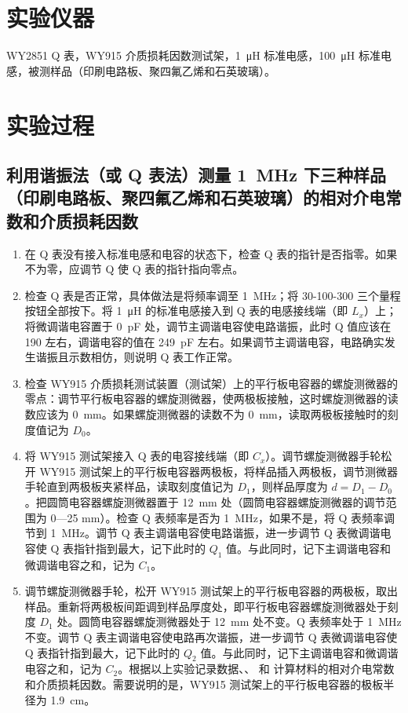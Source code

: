 \section{实验仪器}%
    WY2851 Q 表，WY915 介质损耗因数测试架，\SI{1}{\micro\henry} 标准电感，\SI{100}{\micro\henry} 标准电感，被测样品（印刷电路板、聚四氟乙烯和石英玻璃）。

\section{实验过程}%
    \subsection{利用谐振法（或 Q 表法）测量 \SI{1}{\mega\hertz} 下三种样品（印刷电路板、聚四氟乙烯和石英玻璃）的相对介电常数和介质损耗因数}
    \begin{enumerate}
        \item 在 Q 表没有接入标准电感和电容的状态下，检查 Q 表的指针是否指零。如果不为零，应调节 Q 使 Q 表的指针指向零点。
        \item 检查 Q 表是否正常，具体做法是将频率调至 \SI{1}{\mega\hertz}；将 30-100-300 三个量程按钮全部按下。将 \SI{1}{\micro\henry} 的标准电感接入到 Q 表的电感接线端（即 $L_x$）上；将微调谐电容置于 \SI{0}{\pico\farad} 处，调节主调谐电容使电路谐振，此时 Q 值应该在 190 左右，调谐电容的值在 \SI{249}{\pico\farad} 左右。如果调节主调谐电容，电路确实发生谐振且示数相仿，则说明 Q 表工作正常。
        \item 检查 WY915 介质损耗测试装置（测试架）上的平行板电容器的螺旋测微器的零点：调节平行板电容器的螺旋测微器，使两极板接触，这时螺旋测微器的读数应该为 \SI{0}{\milli\metre}。如果螺旋测微器的读数不为 \SI{0}{\milli\metre}，读取两极板接触时的刻度值记为 $D_0$。
        \item 将 WY915 测试架接入 Q 表的电容接线端（即 $C_x$）。调节螺旋测微器手轮松开 WY915 测试架上的平行板电容器两极板，将样品插入两极板，调节测微器手轮直到两极板夹紧样品，读取刻度值记为 $D_1$，则样品厚度为 $d = D_1 - D_0$。把圆筒电容器螺旋测微器置于 \SI{12}{\milli\metre} 处（圆筒电容器螺旋测微器的调节范围为 0—25 \unit{\milli\metre}）。检查 Q 表频率是否为 \SI{1}{\mega\hertz}，如果不是，将 Q 表频率调节到 \SI{1}{\mega\hertz}。调节 Q 表主调谐电容使电路谐振，进一步调节 Q 表微调谐电容使 Q 表指针指到最大，记下此时的 $Q_1$ 值。与此同时，记下主调谐电容和微调谐电容之和，记为 $C_1$。
        \item 调节螺旋测微器手轮，松开 WY915 测试架上的平行板电容器的两极板，取出样品。重新将两极板间距调到样品厚度处，即平行板电容器螺旋测微器处于刻度 $D_1$ 处。圆筒电容器螺旋测微器处于 \SI{12}{\milli\metre} 处不变。Q 表频率处于 \SI{1}{\mega\hertz} 不变。调节 Q 表主调谐电容使电路再次谐振，进一步调节 Q 表微调谐电容使 Q 表指针指到最大，记下此时的 $Q_2$ 值。与此同时，记下主调谐电容和微调谐电容之和，记为 $C_2$。根据以上实验记录数据、、 和 计算材料的相对介电常数和介质损耗因数。需要说明的是，WY915 测试架上的平行板电容器的极板半径为 \SI{1.9}{\centi\metre}。
    \end{enumerate}
